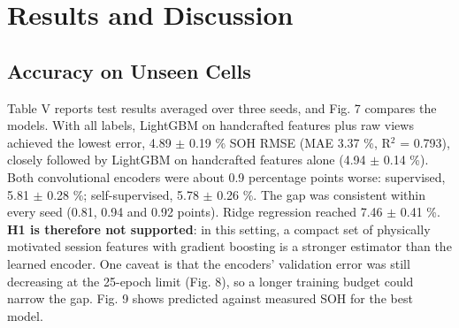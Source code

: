 \documentclass[journal]{IEEEtran}
\begin{document}
\section{Results and Discussion}
\subsection{Accuracy on Unseen Cells}
Table V reports test results averaged over three seeds, and Fig. 7 compares the models. With all labels, LightGBM on handcrafted features plus raw views achieved the lowest error, 4.89 $\pm$ 0.19 \% SOH RMSE (MAE 3.37 \%, R$^2$ = 0.793), closely followed by LightGBM on handcrafted features alone (4.94 $\pm$ 0.14 \%). Both convolutional encoders were about 0.9 percentage points worse: supervised, 5.81 $\pm$ 0.28 \%; self-supervised, 5.78 $\pm$ 0.26 \%. The gap was consistent within every seed (0.81, 0.94 and 0.92 points). Ridge regression reached 7.46 $\pm$ 0.41 \%. \textbf{H1 is therefore not supported}: in this setting, a compact set of physically motivated session features with gradient boosting is a stronger estimator than the learned encoder. One caveat is that the encoders' validation error was still decreasing at the 25-epoch limit (Fig. 8), so a longer training budget could narrow the gap. Fig. 9 shows predicted against measured SOH for the best model.
\end{document}
